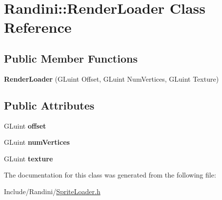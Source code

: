 \hypertarget{classRandini_1_1RenderLoader}{
\section{Randini::RenderLoader Class Reference}
\label{classRandini_1_1RenderLoader}
}
\subsection*{Public Member Functions}
\begin{DoxyCompactItemize}
\item 
\hypertarget{classRandini_1_1RenderLoader_ab6e4698f79e43ddc17780a5d6f69c3c8}{
{\bfseries RenderLoader} (GLuint Offset, GLuint NumVertices, GLuint Texture)}
\label{classRandini_1_1RenderLoader_ab6e4698f79e43ddc17780a5d6f69c3c8}

\end{DoxyCompactItemize}
\subsection*{Public Attributes}
\begin{DoxyCompactItemize}
\item 
\hypertarget{classRandini_1_1RenderLoader_a5eb73d19737ad1333fdec18f66f7a111}{
GLuint {\bfseries offset}}
\label{classRandini_1_1RenderLoader_a5eb73d19737ad1333fdec18f66f7a111}

\item 
\hypertarget{classRandini_1_1RenderLoader_a30bd4b7e30020ccb8c1684c25cb51451}{
GLuint {\bfseries numVertices}}
\label{classRandini_1_1RenderLoader_a30bd4b7e30020ccb8c1684c25cb51451}

\item 
\hypertarget{classRandini_1_1RenderLoader_aa7f1e320201f3b9b7e0c90799ca4b362}{
GLuint {\bfseries texture}}
\label{classRandini_1_1RenderLoader_aa7f1e320201f3b9b7e0c90799ca4b362}

\end{DoxyCompactItemize}


The documentation for this class was generated from the following file:\begin{DoxyCompactItemize}
\item 
Include/Randini/\hyperlink{SpriteLoader_8h}{SpriteLoader.h}\end{DoxyCompactItemize}
